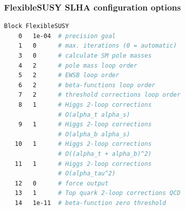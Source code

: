 \documentclass[hyperref={pdfpagelabels=false},ngerman]{beamer}
\begin{document}
\begin{frame}
  \frametitle{FlexibleSUSY SLHA configuration options}
  \small
  \begin{lstlisting}[language=bash]
Block FlexibleSUSY
    0   1e-04  # precision goal
    1   0      # max. iterations (0 = automatic)
    3   0      # calculate SM pole masses
    4   2      # pole mass loop order
    5   2      # EWSB loop order
    6   2      # beta-functions loop order
    7   2      # threshold corrections loop order
    8   1      # Higgs 2-loop corrections
               # O(alpha_t alpha_s)
    9   1      # Higgs 2-loop corrections
               # O(alpha_b alpha_s)
   10   1      # Higgs 2-loop corrections
               # O((alpha_t + alpha_b)^2)
   11   1      # Higgs 2-loop corrections
               # O(alpha_tau^2)
   12   0      # force output
   13   1      # Top quark 2-loop corrections QCD
   14   1e-11  # beta-function zero threshold
  \end{lstlisting}
\end{frame}
\end{document}
